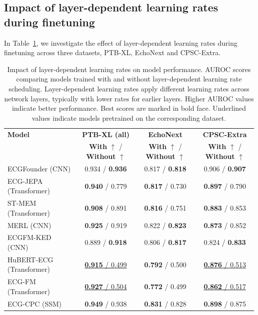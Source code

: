 \documentclass{article}
\begin{document}
        \subsection{Impact of layer-dependent learning rates during finetuning}
        In Table~\ref{tab:lrdep}, we investigate the effect of layer-dependent learning rates during finetuning across three datasets, PTB-XL, EchoNext and CPSC-Extra.

        \begin{table}[htbp]
            \centering
            \small
            \caption{Impact of layer-dependent learning rates on model performance. AUROC scores comparing models trained with and without layer-dependent learning rate scheduling. Layer-dependent learning rates apply different learning rates across network layers, typically with lower rates for earlier layers. Higher AUROC values indicate better performance. Best scores are marked in bold face. Underlined values indicate models pretrained on the corresponding dataset.}
            \begin{tabular}{lccc}
                \toprule
                \textbf{Model} & \textbf{PTB-XL (all)} & \textbf{EchoNext} & \textbf{CPSC-Extra} \\
                 & \textbf{With} $\uparrow$ / \textbf{Without} $\uparrow$ & \textbf{With} $\uparrow$ / \textbf{Without} $\uparrow$ & \textbf{With} $\uparrow$ / \textbf{Without} $\uparrow$ \\
                \midrule
                ECGFounder (CNN) & 0.934 / \textbf{0.936}  & 0.817 / \textbf{0.818} & 0.906 / \textbf{0.907} \\
                ECG-JEPA (Transformer) & \textbf{0.940} / 0.779  & \textbf{0.817} / 0.730 & \textbf{0.897} / 0.790 \\
                ST-MEM (Transformer) & \textbf{0.908} / 0.891 & \textbf{0.816} / 0.751 & \textbf{0.883} / 0.853 \\
                MERL (CNN) & \textbf{0.925} / 0.919 & 0.822 / \textbf{0.823} & \textbf{0.873} / 0.852 \\
                ECGFM-KED (CNN) & 0.889 / \textbf{0.918} & 0.806 / \textbf{0.817} & 0.824 / \textbf{0.833} \\
                HuBERT-ECG (Transformer) & \underline{\textbf{0.915} / 0.499} & \textbf{0.792} / 0.500 & \underline{\textbf{0.876} / 0.513} \\
                ECG-FM (Transformer) & \underline{\textbf{0.927} / 0.504} & \textbf{0.772} / 0.499 & \underline{\textbf{0.862} / 0.517} \\
                ECG-CPC (SSM) & \textbf{0.949} / 0.938 & \textbf{0.831} / 0.828 & \textbf{0.898} / 0.875 \\
                \bottomrule
            \end{tabular}
            \label{tab:lrdep}
        \end{table}
\end{document}
